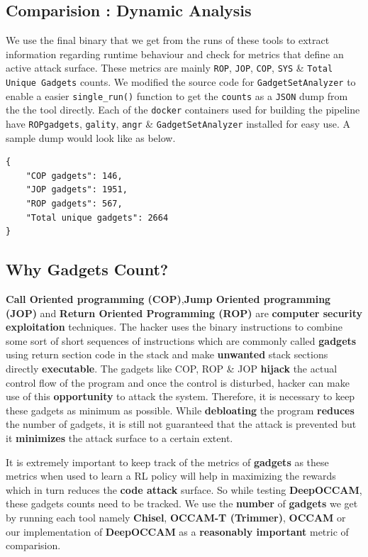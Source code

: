 \documentclass{relatorio}
\begin{document}
\subsection{Comparision : Dynamic Analysis}%
\label{Tools}

We use the final binary that we get from the runs of these tools to extract information regarding runtime behaviour and check for metrics that define an active attack surface. These metrics are mainly \texttt{ROP}, \texttt{JOP}, \texttt{COP}, \texttt{SYS} \& \texttt{Total Unique Gadgets} counts. We modified the source code for \texttt{GadgetSetAnalyzer} to enable a easier \texttt{single\_run()} function to get the \texttt{counts} as a \texttt{JSON} dump from the the tool directly. Each of the \texttt{docker} containers used for building the pipeline
have \texttt{ROPgadgets}, \texttt{gality}, \texttt{angr} \& \texttt{GadgetSetAnalyzer} installed for easy use. A sample dump would look like as below.
\begin{lstlisting}
{
	"COP gadgets": 146,
	"JOP gadgets": 1951,
	"ROP gadgets": 567,
	"Total unique gadgets": 2664
}
\end{lstlisting} 

\subsection{Why Gadgets Count?}%
\label{Tools}

\textbf{Call Oriented programming (COP)},\textbf{Jump Oriented programming (JOP)} and \textbf{Return Oriented Programming (ROP)} are \textbf{computer security exploitation} techniques. The hacker uses the binary instructions to combine some sort of short sequences of instructions which are commonly called \textbf{gadgets} using return section code in the stack and make \textbf{unwanted} stack sections directly \textbf{executable}. The gadgets like COP, ROP \& JOP \textbf{hijack} the actual control flow of the program and once the control is disturbed, hacker can make use of this \textbf{opportunity} to attack the system. Therefore, it is necessary to keep these gadgets as minimum as possible. While \textbf{debloating} the program \textbf{reduces} the number of gadgets, it is still not guaranteed that the attack is prevented but it \textbf{minimizes} the attack surface to a certain extent.

It is extremely important to keep track of the metrics of \textbf{gadgets} as these metrics when used to learn a RL policy will help in maximizing the rewards which in turn reduces the \textbf{code attack} surface. So while testing \textbf{DeepOCCAM}, these gadgets counts need to be tracked. We use the \textbf{number} of \textbf{gadgets} we get by running each tool namely \textbf{Chisel}, \textbf{OCCAM-T (Trimmer)}, \textbf{OCCAM} or our implementation of \textbf{DeepOCCAM} as a \textbf{\color{ao(english)} reasonably important} metric of comparision.
\end{document}
